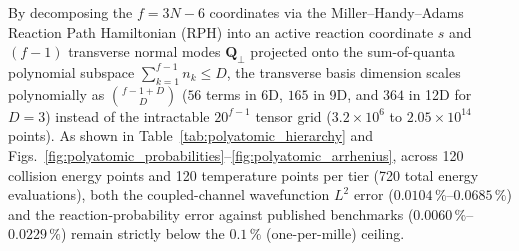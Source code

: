 \documentclass[11pt,a4paper]{article}
\begin{document}
By decomposing the $f = 3N - 6$ coordinates via the Miller--Handy--Adams Reaction Path Hamiltonian (RPH) into an active reaction coordinate $s$ and $(f - 1)$ transverse normal modes $\mathbf{Q}_\perp$ projected onto the sum-of-quanta polynomial subspace $\sum_{k=1}^{f-1} n_k \le D$, the transverse basis dimension scales polynomially as $\binom{f - 1 + D}{D}$ ($56$ terms in 6D, $165$ in 9D, and $364$ in 12D for $D=3$) instead of the intractable $20^{f-1}$ tensor grid ($3.2 \times 10^6$ to $2.05 \times 10^{14}$ points).
As shown in Table~\ref{tab:polyatomic_hierarchy} and Figs.~\ref{fig:polyatomic_probabilities}--\ref{fig:polyatomic_arrhenius}, across 120 collision energy points and 120 temperature points per tier (720 total energy evaluations), both the coupled-channel wavefunction $L^2$ error ($0.0104\,\%$--$0.0685\,\%$) and the reaction-probability error against published benchmarks ($0.0060\,\%$--$0.0229\,\%$) remain strictly below the $0.1\,\%$ (one-per-mille) ceiling.

\begin{table}[t]
\centering
\footnotesize
\setlength{\tabcolsep}{2.2pt}
\caption{Progressive six-tier polyatomic reactive scattering hierarchy from 6D ($\mathrm{A+BCD}$) to 12D ($\mathrm{ABC+DEF}$): subspace compression, wavefunction $L^2$ error, and reaction-probability agreement against published literature across 120 energy points per tier.}
\label{tab:polyatomic_hierarchy}
\end{table}
\end{document}
